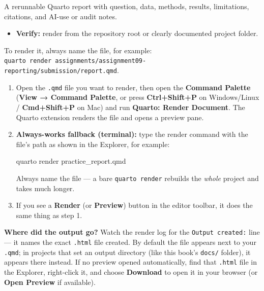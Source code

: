 \documentclass[
  letterpaper,
  DIV=11,
  numbers=noendperiod,
  oneside]{scrreprt}
\newenvironment{Shaded}{\begin{snugshade}}{\end{snugshade}}
\newcommand{\ExtensionTok}[1]{\textcolor[rgb]{0.00,0.23,0.31}{#1}}
\newcommand{\NormalTok}[1]{\textcolor[rgb]{0.00,0.23,0.31}{#1}}
\providecommand{\tightlist}{%
  \setlength{\itemsep}{0pt}\setlength{\parskip}{0pt}}
\begin{document}
A rerunnable Quarto report with question, data, methods, results,
limitations, citations, and AI-use or audit notes.

\begin{itemize}
\tightlist
\item
  \textbf{Verify:} render from the repository root or clearly documented
  project folder.
\end{itemize}

To render it, always name the file, for example:
\texttt{quarto\ render\ assignments/assignment09-reporting/submission/report.qmd}.

\begin{tcolorbox}[enhanced jigsaw, title=\textcolor{quarto-callout-tip-color}{\faLightbulb}\hspace{0.5em}{How to render: the course default}, arc=.35mm, toptitle=1mm, colframe=quarto-callout-tip-color-frame, toprule=.15mm, leftrule=.75mm, bottomtitle=1mm, opacityback=0, bottomrule=.15mm, coltitle=black, breakable, opacitybacktitle=0.6, titlerule=0mm, colback=white, left=2mm, colbacktitle=quarto-callout-tip-color!10!white, rightrule=.15mm]

\begin{enumerate}
\def\labelenumi{\arabic{enumi}.}
\item
  Open the \texttt{.qmd} file you want to render, then open the
  \textbf{Command Palette} (\textbf{View → Command Palette}, or press
  \textbf{Ctrl+Shift+P} on Windows/Linux / \textbf{Cmd+Shift+P} on Mac)
  and run \textbf{Quarto: Render Document}. The Quarto extension renders
  the file and opens a preview pane.
\item
  \textbf{Always-works fallback (terminal):} type the render command
  with the file's path as shown in the Explorer, for example:

\begin{Shaded}
\begin{Highlighting}[numbers=left,,]
\ExtensionTok{quarto}\NormalTok{ render practice\_report.qmd}
\end{Highlighting}
\end{Shaded}

  Always name the file --- a bare \texttt{quarto\ render} rebuilds the
  \emph{whole} project and takes much longer.
\item
  If you see a \textbf{Render} (or \textbf{Preview}) button in the
  editor toolbar, it does the same thing as step 1.
\end{enumerate}

\textbf{Where did the output go?} Watch the render log for the
\texttt{Output\ created:} line --- it names the exact \texttt{.html}
file created. By default the file appears next to your \texttt{.qmd}; in
projects that set an output directory (like this book's \texttt{docs/}
folder), it appears there instead. If no preview opened automatically,
find that \texttt{.html} file in the Explorer, right-click it, and
choose \textbf{Download} to open it in your browser (or \textbf{Open
Preview} if available).

\end{tcolorbox}
\end{document}
